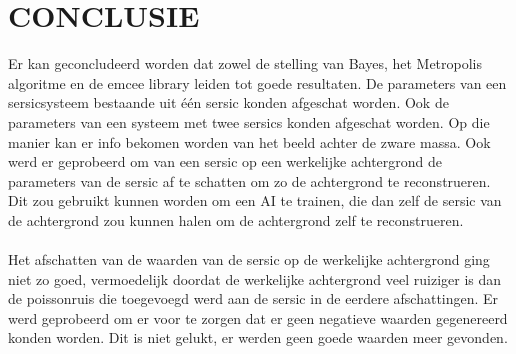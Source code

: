 \section{CONCLUSIE}
Er kan geconcludeerd worden dat zowel de stelling van Bayes, het Metropolis algoritme en de emcee library leiden tot goede resultaten. De parameters van een sersicsysteem bestaande uit één sersic konden afgeschat worden. Ook de parameters van een systeem met twee sersics konden afgeschat worden. Op die manier kan er info bekomen worden van het beeld achter de zware massa. Ook werd er geprobeerd om van een sersic op een werkelijke achtergrond de parameters van de sersic af te schatten om zo de achtergrond te reconstrueren. Dit zou gebruikt kunnen worden om een AI te trainen, die dan zelf de sersic van de achtergrond zou kunnen halen om de achtergrond zelf te reconstrueren. \\ \\
Het afschatten van de waarden van de sersic op de werkelijke achtergrond ging niet zo goed, vermoedelijk doordat de werkelijke achtergrond veel ruiziger is dan de poissonruis die toegevoegd werd aan de sersic in de eerdere afschattingen. Er werd geprobeerd om er voor te zorgen dat er geen negatieve waarden gegenereerd konden worden. Dit is niet gelukt, er werden geen goede waarden meer gevonden.